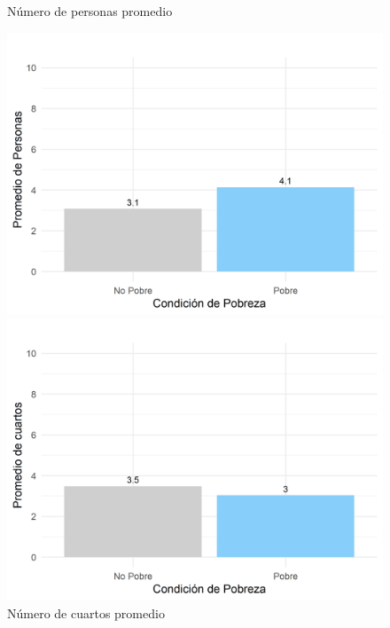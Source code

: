 \documentclass[a4paper]{article}
\theoremstyle{remark}
\theoremstyle{definition}
\begin{document}
   \begin{figure}[H]
    \centering
    \begin{minipage}{0.5\textwidth}
        \centering
         \caption{Número de personas promedio}
        \includegraphics[width=\linewidth]{Graficas/personas_hogar.png}  
    \end{minipage}\hfill
    \begin{minipage}{0.5\textwidth}
        \centering
         \caption{Número de cuartos promedio}
        \includegraphics[width=\linewidth]{Graficas/num_cuartos.png} 
    \end{minipage}
\end{figure}
\end{document}
